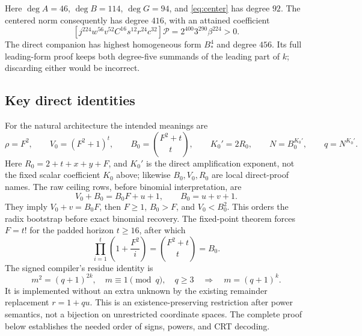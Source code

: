 Here $\deg A=46$, $\deg B=114$, $\deg G=94$, and \eqref{eq:center} has degree $92$. The centered norm consequently has degree $416$, with an attained coefficient
\[
 [j^{224}w^{56}v^{52}C^{16}s^{12}r^{24}c^{32}]\mathcal P
 =2^{400}3^{290}\beta^{224}>0.
\]
The direct companion has highest homogeneous form $B_*^4$ and degree $456$. Its full leading-form proof keeps both degree-five summands of the leading part of $k$; discarding either would be incorrect.

\subsection{Key direct identities}
For the natural architecture the intended meanings are
\[
 \rho=F^2,\qquad V_0=(F^2+1)^t,\qquad
 B_0=\binom{F^2+t}{t},\qquad K_0'=2R_0,\qquad
 N=B_0^{K_0'},\qquad q=N^{K_0'}.
\]
Here $R_0=2+t+x+y+F$, and $K_0'$ is the direct amplification exponent, not the fixed scalar coefficient $K_0$ above; likewise $B_0,V_0,R_0$ are local direct-proof names. The raw ceiling rows, before binomial interpretation, are
\[
 V_0+B_0=B_0F+u+1,\qquad B_0=u+v+1.
\]
They imply $V_0+v=B_0F$, then $F\ge1$, $B_0>F$, and $V_0<B_0^2$. This orders the radix bootstrap before exact binomial recovery. The fixed-point theorem forces $F=t!$ for the padded horizon $t\ge16$, after which
\[
 \prod_{i=1}^{t}\left(1+\frac{F^2}{i}\right)
 =\binom{F^2+t}{t}=B_0.
\]
The signed compiler's residue identity is
\[
 m^2=(q+1)^{2k},\quad m\equiv1\pmod q,\quad q\ge3
 \quad\Longrightarrow\quad m=(q+1)^k.
\]
It is implemented without an extra unknown by the existing remainder replacement $r=1+qu$. This is an existence-preserving restriction after power semantics, not a bijection on unrestricted coordinate spaces. The complete proof below establishes the needed order of signs, powers, and CRT decoding.
